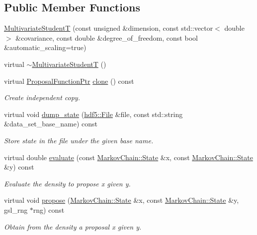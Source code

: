\subsection*{Public Member Functions}
\begin{DoxyCompactItemize}
\item 
\hyperlink{classeos_1_1proposal__functions_1_1MultivariateStudentT_a491d401a59792405c093865094f23810}{MultivariateStudentT} (const unsigned \&dimension, const std::vector$<$ double $>$ \&covariance, const double \&degree\_\-of\_\-freedom, const bool \&automatic\_\-scaling=true)
\item 
virtual \hyperlink{classeos_1_1proposal__functions_1_1MultivariateStudentT_acc497f43328165a02524291ed7383a89}{$\sim$MultivariateStudentT} ()
\item 
virtual \hyperlink{namespaceeos_ae97f9891c67c90959a03fc96efaa4dc9}{ProposalFunctionPtr} \hyperlink{classeos_1_1proposal__functions_1_1MultivariateStudentT_a4f5007a73e656d9ff0476a4b5740018b}{clone} () const 
\begin{DoxyCompactList}\small\item\em Create independent copy. \item\end{DoxyCompactList}\item 
virtual void \hyperlink{classeos_1_1proposal__functions_1_1MultivariateStudentT_ab6afe975a0e1a553b785be0fd4daec05}{dump\_\-state} (\hyperlink{classeos_1_1hdf5_1_1File}{hdf5::File} \&file, const std::string \&data\_\-set\_\-base\_\-name) const 
\begin{DoxyCompactList}\small\item\em Store state in the file under the given base name. \item\end{DoxyCompactList}\item 
virtual double \hyperlink{classeos_1_1proposal__functions_1_1MultivariateStudentT_a9ca45b3dad5b0e6612ba27f7fb4e1973}{evaluate} (const \hyperlink{structeos_1_1MarkovChain_1_1State}{MarkovChain::State} \&x, const \hyperlink{structeos_1_1MarkovChain_1_1State}{MarkovChain::State} \&y) const 
\begin{DoxyCompactList}\small\item\em Evaluate the density to propose x given y. \item\end{DoxyCompactList}\item 
virtual void \hyperlink{classeos_1_1proposal__functions_1_1MultivariateStudentT_ad7c59db9bc93f0fb4b3204b8f272ba6c}{propose} (\hyperlink{structeos_1_1MarkovChain_1_1State}{MarkovChain::State} \&x, const \hyperlink{structeos_1_1MarkovChain_1_1State}{MarkovChain::State} \&y, gsl\_\-rng $\ast$rng) const 
\begin{DoxyCompactList}\small\item\em Obtain from the density a proposal x given y. \item\end{DoxyCompactList}\end{DoxyCompactItemize}
